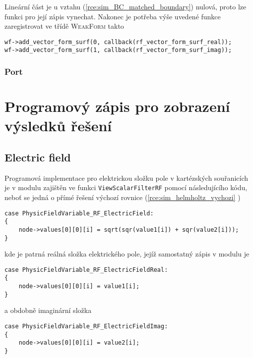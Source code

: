 Lineární část je u vztahu (\ref{rce:sim_BC_matched_boundary}) nulová, proto lze funkci pro její zápis vynechat.
Nakonec je potřeba výše uvedené funkce zaregistrovat ve třídě \textsc{WeakForm} takto
\begin{verbatim}
wf->add_vector_form_surf(0, callback(rf_vector_form_surf_real));
wf->add_vector_form_surf(1, callback(rf_vector_form_surf_imag));           
\end{verbatim}
                
\subsubsection*{Port}

\section{Programový zápis pro zobrazení výsledků řešení}
\subsection*{Electric field}
Programová implementace pro elektrickou složku pole v kartézských souřanicích je v modulu zajištěn ve funkci \texttt{ViewScalarFilterRF} pomocí následujícího kódu, neboť se jedná o přímé řešení výchozí rovnice (\ref{rce:sim_helmholtz_vychozi} )
\begin{verbatim}
case PhysicFieldVariable_RF_ElectricField:
{
    node->values[0][0][i] = sqrt(sqr(value1[i]) + sqr(value2[i]));
}    
\end{verbatim}
kde je patrná reálná složka elektrického pole, jejíž samostatný zápis v modulu je
\begin{verbatim}
case PhysicFieldVariable_RF_ElectricFieldReal:
{
    node->values[0][0][i] = value1[i];
}    
\end{verbatim}
a obdobně imaginární složka 
\begin{verbatim}
case PhysicFieldVariable_RF_ElectricFieldImag:
{    
    node->values[0][0][i] = value2[i];
}
\end{verbatim}


